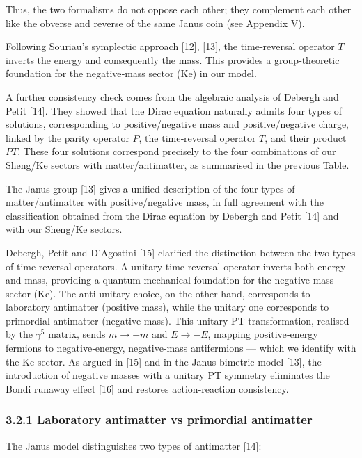 \documentclass[11pt]{article}
\begin{document}
Thus, the two formalisms do not oppose each other; they complement each
other like the obverse and reverse of the same Janus coin (see Appendix
V).

Following Souriau's symplectic approach {[}12{]}, {[}13{]}, the
time‑reversal operator \(T\) inverts the energy and consequently the
mass. This provides a group‑theoretic foundation for the negative‑mass
sector (Ke) in our model.

A further consistency check comes from the algebraic analysis of Debergh
and Petit {[}14{]}. They showed that the Dirac equation naturally admits
four types of solutions, corresponding to positive/negative mass and
positive/negative charge, linked by the parity operator \(P\), the
time‑reversal operator \(T\), and their product \(PT\). These four
solutions correspond precisely to the four combinations of our Sheng/Ke
sectors with matter/antimatter, as summarised in the previous Table.

The Janus group {[}13{]} gives a unified description of the four types
of matter/antimatter with positive/negative mass, in full agreement with
the classification obtained from the Dirac equation by Debergh and Petit
{[}14{]} and with our Sheng/Ke sectors.

Debergh, Petit and D'Agostini {[}15{]} clarified the distinction between
the two types of time‑reversal operators. A unitary time‑reversal
operator inverts both energy and mass, providing a quantum‑mechanical
foundation for the negative‑mass sector (Ke). The anti‑unitary choice,
on the other hand, corresponds to laboratory antimatter (positive mass),
while the unitary one corresponds to primordial antimatter (negative
mass). This unitary PT transformation, realised by the \(\gamma^5\)
matrix, sends \(m \to -m\) and \(E \to -E\), mapping positive‑energy
fermions to negative‑energy, negative‑mass antifermions --- which we
identify with the Ke sector. As argued in {[}15{]} and in the Janus
bimetric model {[}13{]}, the introduction of negative masses with a
unitary PT symmetry eliminates the Bondi runaway effect {[}16{]} and
restores action‑reaction consistency.

\hypertarget{laboratory-antimatter-vs-primordial-antimatter}{%
\subsubsection{3.2.1 Laboratory antimatter vs primordial
antimatter}\label{laboratory-antimatter-vs-primordial-antimatter}}

The Janus model distinguishes two types of antimatter {[}14{]}:
\end{document}
